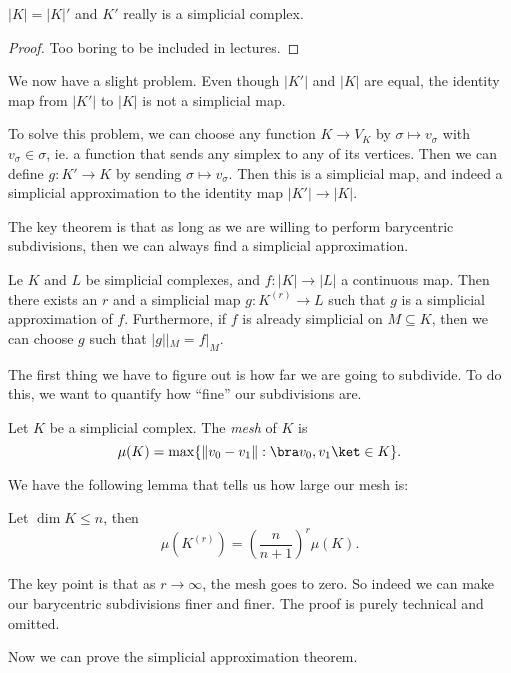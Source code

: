 \documentclass[a4paper]{article}
\begin{document}
\begin{prop}
  $|K| = |K|'$ and $K'$ really is a simplicial complex.
\end{prop}

\begin{proof}
  Too boring to be included in lectures.
\end{proof}

We now have a slight problem. Even though $|K'|$ and $|K|$ are equal, the identity map from $|K'|$ to $|K|$ is not a simplicial map.

To solve this problem, we can choose any function $K \to V_K$ by $\sigma \mapsto v_\sigma$ with $v_\sigma \in \sigma$, ie. a function that sends any simplex to any of its vertices. Then we can define $g: K' \to K$ by sending $\hat{\sigma} \mapsto v_\sigma$. Then this is a simplicial map, and indeed a simplicial approximation to the identity map $|K'| \to |K|$.

The key theorem is that as long as we are willing to perform barycentric subdivisions, then we can always find a simplicial approximation.

\begin{thm}
  Le $K$ and $L$ be simplicial complexes, and $f: |K| \to |L|$ a continuous map. Then there exists an $r$ and a simplicial map $g: K^{(r)} \to L$ such that $g$ is a simplicial approximation of $f$. Furthermore, if $f$ is already simplicial on $M\subseteq K$, then we can choose $g$ such that $|g||_M = f|_M$.
\end{thm}

The first thing we have to figure out is how far we are going to subdivide. To do this, we want to quantify how ``fine'' our subdivisions are.
\begin{defi}[Mesh]
  Let $K$ be a simplicial complex. The \emph{mesh} of $K$ is
  \[
    \mu(K) = \max\{\|v_0 - v_1\| : \bra v_0, v_1\ket \in K\}.
  \]
\end{defi}

We have the following lemma that tells us how large our mesh is:
\begin{lemma}
  Let $\dim K \leq n$, then
  \[
    \mu(K^{(r)}) = \left(\frac{n}{n + 1}\right)^r \mu(K).
  \]
\end{lemma} %
The key point is that as $r \to \infty$, the mesh goes to zero. So indeed we can make our barycentric subdivisions finer and finer. The proof is purely technical and omitted.

Now we can prove the simplicial approximation theorem.
\end{document}
